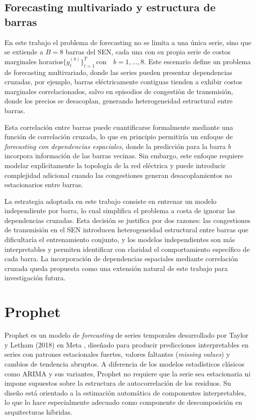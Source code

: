 \subsection{Forecasting multivariado y estructura de barras}

En este trabajo el problema de forecasting no se limita a una única serie, sino que se extiende a $B = 8$ barras del SEN, cada una con su propia serie de costos marginales horarios$\{y_t^{(b)}\}_{t=1}^{T} \, \text{con} \quad b=1, ...,8$. Este escenario define un problema de forecasting multivariado, donde las series pueden presentar dependencias cruzadas, por ejemplo, barras eléctricamente contiguas tienden a exhibir costos marginales correlacionados, salvo en episodios de congestión de transmisión, donde los precios se desacoplan, generando heterogeneidad estructural entre barras. 

Esta correlación entre barras puede cuantificarse formalmente mediante una función de correlación cruzada, lo que en principio permitiría un enfoque de \textit{forecasting con dependencias espaciales}, donde la predicción para la barra $b$ incorpora información de las barras vecinas. Sin embargo, este enfoque requiere modelar explícitamente la topología de la red eléctrica y puede introducir complejidad adicional cuando las congestiones generan desacoplamientos no estacionarios entre barras.

La estrategia adoptada en este trabajo consiste en entrenar un modelo independiente por barra, lo cual simplifica el problema a costa de ignorar las dependencias cruzadas. Esta decisión se justifica por dos razones: las congestiones de transmisión en el SEN introducen heterogeneidad estructural entre barras que dificultaría el entrenamiento conjunto, y los modelos independientes son más interpretables y permiten identificar con claridad el comportamiento específico de cada barra. La incorporación de dependencias espaciales mediante correlación cruzada queda propuesta como una extensión natural de este trabajo para investigación futura.

\section{Prophet}

Prophet es un modelo de \textit{forecasting} de series temporales desarrollado por Taylor y Letham (2018) en Meta \cite{Prophet}, diseñado para producir predicciones interpretables en series con patrones estacionales fuertes, valores faltantes (\textit{missing values}) y cambios de tendencia abruptos. A diferencia de los modelos estadísticos clásicos como ARIMA y sus variantes, Prophet no requiere que la serie sea estacionaria ni impone supuestos sobre la estructura de autocorrelación de los residuos. Su diseño está orientado a la estimación automática de componentes interpretables, lo que lo hace especialmente adecuado como componente de descomposición en arquitecturas híbridas.

